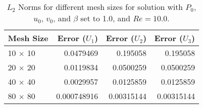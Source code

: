 \begin{table}
\begin{center}
\begin{tabular}{|l | r | r | r |}
\hline
Mesh Size & Error ($U_1$) & Error ($U_2$) & Error ($U_3$) \\
\hline
10 $\times$ 10 & 0.0479469 & 0.195058 & 0.195058 \\
20 $\times$ 20 & 0.0119834 & 0.0500259 & 0.0500259 \\
40 $\times$ 40 & 0.0029957 & 0.0125859 & 0.0125859 \\
80 $\times$ 80 & 0.000748916 & 0.00315144 & 0.00315144 \\
\hline
\end{tabular}
\caption{$L_2$ Norms for different mesh sizes for solution with $P_0$, $u_0$, $v_0$, and $\beta$ set to 1.0, and $Re = 10.0$.}
\label{norm}
\end{center}
\end{table}
